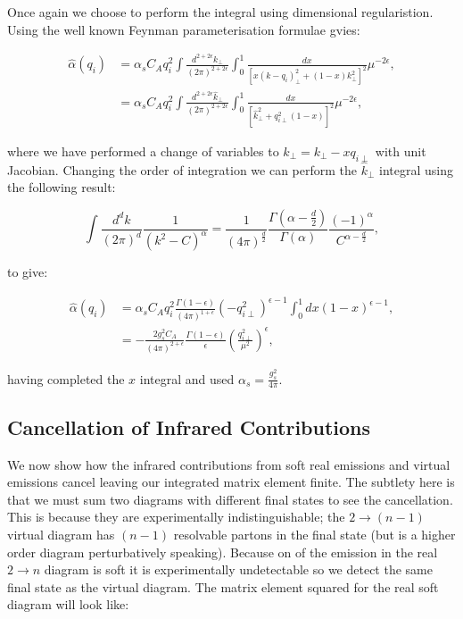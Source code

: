 		Once again we choose to perform the integral using dimensional regularistion.
		Using the well known Feynman parameterisation formulae gvies:

		\begin{align}
			\hat{\alpha}(q_i) &= \alpha_sC_Aq_i^2\int \frac{d^{2+2\epsilon}k_{\perp}}{(2\pi)^{2+2\epsilon}}\int_0^1
				\frac{dx}{[x(k - q_{i})^2_\perp + (1-x)k_\perp^2]^2}\mu^{-2\epsilon}, \\
				&= \alpha_sC_Aq_i^2\int \frac{d^{2+2\epsilon}\hat{k}_{\perp}}{(2\pi)^{2+2\epsilon}}\int_0^1
				\frac{dx}{[\hat{k}^2 _\perp + q_{i\perp}^2(1-x)]^2}\mu^{-2\epsilon},
		\end{align}

		where we have performed a change of variables to $\hat{k}_\perp = k_\perp - xq_{i\perp}$ with
		unit Jacobian.  Changing the order of integration we can perform the $\hat{k}_\perp$ integral
		using the following result:

		\begin{equation}
			\int \frac{d^dk}{(2\pi)^d}\frac{1}{(k^2 - C)^\alpha} = \frac{1}{(4\pi)^{\frac{d}{2}}}
				\frac{\Gamma(\alpha - \frac{d}{2})}{\Gamma(\alpha)}\frac{(-1)^\alpha}{C^{\alpha - \frac{d}{2}}},
		\end{equation}

		to give:

		\begin{align}
			\hat{\alpha}(q_i) &= \alpha_sC_Aq_i^2\frac{\Gamma(1-\epsilon)}{(4\pi)^{1+\epsilon}}(-q_{i\perp}^2)^{\epsilon-1}
				\int_0^1 dx(1-x)^{\epsilon-1}, \\
				&= -\frac{2g_s^2C_A}{(4\pi)^{2+\epsilon}}\frac{\Gamma(1-\epsilon)}{\epsilon}\left(\frac{q_{i\perp}^2}{\mu^2}\right)^\epsilon,
		\end{align}

		having completed the $x$ integral and used $\alpha_s=\frac{g_s^2}{4\pi}$.

	\subsection{Cancellation of Infrared Contributions}
	\label{sub:subsection_name}

		We now show how the infrared contributions from soft real emissions and virtual emissions cancel leaving
		our integrated matrix element finite.  The subtlety here is that we must sum two diagrams with different
		final states to see the cancellation.  This is because they are experimentally indistinguishable;
		the $2\rightarrow (n-1)$ virtual diagram has $(n-1)$ resolvable partons in the final state (but is a
		higher order diagram perturbatively speaking).  Because on of the emission in the real $2\rightarrow n$
		diagram is soft it is experimentally undetectable so we detect the same final state as the virtual diagram.
		The matrix element squared for the real soft diagram will look like:

